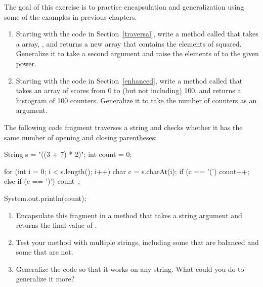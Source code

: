\begin{exercise}  %

The goal of this exercise is to practice encapsulation and generalization using some of the examples in previous chapters.

\begin{enumerate}

\item Starting with the code in Section~\ref{traversal}, write a method called  that takes a  array, , and returns a new array that contains the elements of  squared.
Generalize it to take a second argument and raise the elements of  to the given power.

\item Starting with the code in Section~\ref{enhanced}, write a method called  that takes an  array of scores from 0 to (but not including) 100, and returns a histogram of 100 counters.
Generalize it to take the number of counters as an argument.

\end{enumerate}

\end{exercise}


\begin{exercise}  %


The following code fragment traverses a string and checks whether it has the same number of opening and closing parentheses:

\begin{code}
String s = "((3 + 7) * 2)";
int count = 0;

for (int i = 0; i < s.length(); i++) {
    char c = s.charAt(i);
    if (c == '(') {
        count++;
    } else if (c == ')') {
        count--;
    }
}

System.out.println(count);
\end{code}

\begin{enumerate}

\item Encapsulate this fragment in a method that takes a string argument and returns the final value of .

\item Test your method with multiple strings, including some that are balanced and some that are not.

\item Generalize the code so that it works on any string. What could you do to generalize it more?

\end{enumerate}

\end{exercise}
